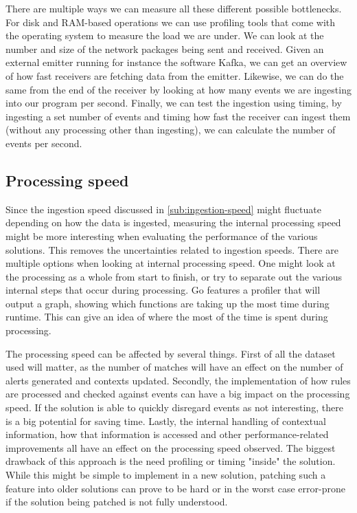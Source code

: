 There are multiple ways we can measure all these different possible bottlenecks. For disk and RAM-based operations we can use profiling tools that come with the operating system to measure the load we are under. We can look at the number and size of the network packages being sent and received. Given an external emitter running for instance the software Kafka, we can get an overview of how fast receivers are fetching data from the emitter. Likewise, we can do the same from the end of the receiver by looking at how many events we are ingesting into our program per second. Finally, we can test the ingestion using timing, by ingesting a set number of events and timing how fast the receiver can ingest them (without any processing other than ingesting), we can calculate the number of events per second.

\subsection{Processing speed}
\label{subs:processing-speed}
Since the ingestion speed discussed in \cref{sub:ingestion-speed} might fluctuate depending on how the data is ingested, measuring the internal processing speed might be more interesting when evaluating the performance of the various solutions. This removes the uncertainties related to ingestion speeds. There are multiple options when looking at internal processing speed. One might look at the processing as a whole from start to finish, or try to separate out the various internal steps that occur during processing. Go features a profiler that will output a graph, showing which functions are taking up the most time during runtime. This can give an idea of where the most of the time is spent during processing.

The processing speed can be affected by several things. First of all the dataset used will matter, as the number of matches will have an effect on the number of alerts generated and contexts updated.
Secondly, the implementation of how rules are processed and checked against events can have a big impact on the processing speed. If the solution is able to quickly disregard events as not interesting, there is a big potential for saving time.
Lastly, the internal handling of contextual information, how that information is accessed and other performance-related improvements all have an effect on the processing speed observed.
The biggest drawback of this approach is the need profiling or timing "inside" the solution. While this might be simple to implement in a new solution, patching such a feature into older solutions can prove to be hard or in the worst case error-prone if the solution being patched is not fully understood.

